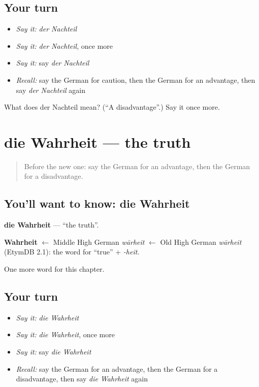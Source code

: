 \subsection*{Your turn}
\begin{itemize}
\raggedright
  \item \emph{Say it:} \emph{der Nachteil}
  \item \emph{Say it:} \emph{der Nachteil}, once more
  \item \emph{Say it:} say \emph{der Nachteil}
  \item \emph{Recall:} say the German for caution, then the German for an advantage, then say \emph{der Nachteil} again
\end{itemize}

\begin{tcolorbox}[breakable,colback=teal!4,colframe=teal!35!black,title={Before you move on}]
What does der Nachteil mean? (\textquotedblleft{}A disadvantage\textquotedblright{}.) Say it once more.
\end{tcolorbox}
\section[die Wahrheit]{die Wahrheit — the truth}

\label{lesson:GE-C243-wahrheit}



\begin{quote}
Before the new one: say the German for an advantage, then the German for a disadvantage.
\end{quote}

\subsection*{You'll want to know: die Wahrheit}
\textbf{die Wahrheit} — \textquotedblleft{}the truth\textquotedblright{}.

\begin{cousinweb}
\textbf{Wahrheit} $\leftarrow$ Middle High German \emph{wārheit} $\leftarrow$ Old High German \emph{wārheit} (EtymDB 2.1): the word for \textquotedblleft{}true\textquotedblright{} + \emph{-heit}.
\end{cousinweb}

\begin{grammarlens}[title={What you've built}]
One more word for this chapter.
\end{grammarlens}

\subsection*{Your turn}
\begin{itemize}
\raggedright
  \item \emph{Say it:} \emph{die Wahrheit}
  \item \emph{Say it:} \emph{die Wahrheit}, once more
  \item \emph{Say it:} say \emph{die Wahrheit}
  \item \emph{Recall:} say the German for an advantage, then the German for a disadvantage, then say \emph{die Wahrheit} again
\end{itemize}

